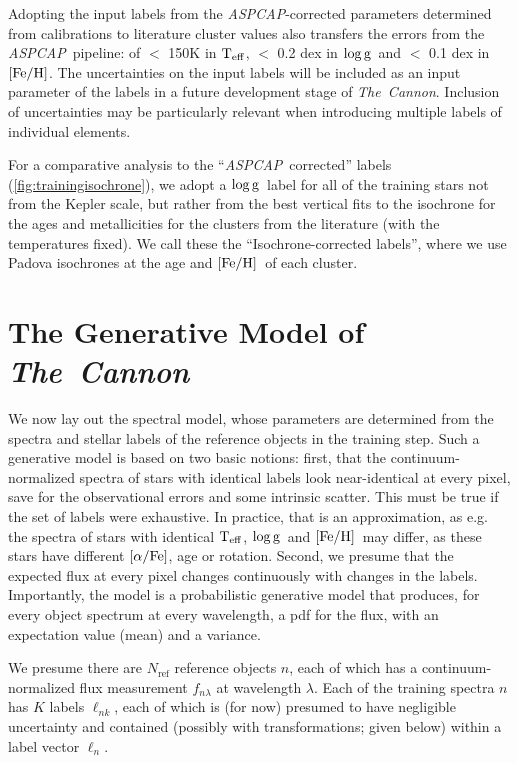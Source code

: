 \documentclass[12pt, preprint]{aastex}
\newcommand{\tc}{\textsl{The~Cannon}}
\newcommand{\aspcap}{\textsl{ASPCAP}}
\newcommand{\set}[1]{\bm{#1}}
\newcommand{\starlabel}{\ell}
\newcommand{\starlabelvec}{\set{\starlabel}}
\newcommand{\teff}{\mbox{$\rm T_{eff}$}}
\newcommand{\feh}{\mbox{$\rm [Fe/H]$}}
\newcommand{\alphafe}{\mbox{$\rm [\alpha/Fe]$}}
\newcommand{\logg}{\mbox{$\rm \log g$}}
\newcommand{\rfn}{\mathrm{ref}}
\begin{document}
Adopting the input labels from the \aspcap-corrected parameters determined from calibrations to literature cluster values also transfers the errors from the \aspcap\ pipeline: of $<$ 150K in \teff,  $<$ 0.2 dex in \logg\ and $<$ 0.1 dex in \feh.   
The uncertainties on the input labels will be included as an input parameter of the labels in a future development stage of \tc. Inclusion of uncertainties may be particularly relevant when introducing multiple labels of individual elements. 

For a comparative analysis to the ``\aspcap\ corrected'' labels (\figurename\ref{fig:trainingisochrone}), we adopt a \logg\ label for all of the training stars not from the Kepler scale, but rather from the best vertical fits to the isochrone for the ages and metallicities for the clusters from the literature (with the temperatures fixed).
We call these the ``Isochrone-corrected labels'', where we use Padova isochrones at the age and \feh\ of each cluster. 

\section{The Generative Model of \tc}
\label{sec:spectralmodel}

We now lay out the spectral model, whose parameters are determined 
from the spectra and stellar labels of the reference objects in the training step.
Such a generative model is based on two basic notions: first, that the continuum-normalized spectra of
stars with identical labels look near-identical at every pixel, save for the observational errors
and some intrinsic scatter. This must be true if the set of labels were exhaustive. 
In practice, that is an approximation, as e.g. the spectra of stars with identical \teff , \logg \ and \feh\ may differ, 
as these stars have different \alphafe , age or rotation. Second, we presume that the expected flux at every pixel changes continuously
with changes in the labels.
Importantly, the model is a probabilistic generative model that produces,
for every object spectrum at every wavelength,
a pdf for the flux, with an expectation value (mean) and a variance.

We presume there are $N_\rfn$ reference objects $n$, each of which has
a continuum-normalized flux measurement $f_{n\lambda}$ at wavelength
$\lambda$. Each of the training spectra $n$ has $K$ labels $\starlabel_{nk}$, each of which
is (for now) presumed to have negligible uncertainty and contained (possibly with transformations; given below)
within a label vector $\starlabelvec_n$.
\end{document}
